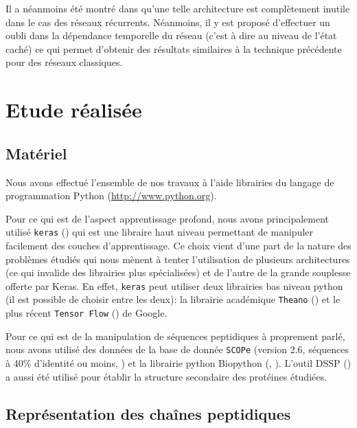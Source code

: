 \documentclass[a4paper, 11pt, onecolumn]{article}
\begin{document}
Il a néanmoins été montré dans \cite{gal2015theoretically} qu'une telle
architecture est complètement inutile dans le cas des réseaux récurrents.
Néanmoins, il y est proposé d'effectuer un oubli dans la dépendance temporelle
du réseau (c'est à dire au niveau de l'état caché) ce qui permet d'obtenir des
résultats similaires à la technique précédente pour des réseaux classiques.

\section{Etude réalisée}
\label{sec:etude}

\subsection{Matériel}

Nous avons effectué l'ensemble de nos travaux à l'aide librairies du langage de
programmation Python (\url{http://www.python.org}).

Pour ce qui est de l'aspect apprentissage profond, nous avons principalement
utilisé \texttt{keras} (\cite{chollet2015keras}) qui est une libraire haut niveau
permettant de manipuler facilement des couches d'apprentissage. Ce choix vient
d'une part de la nature des problèmes étudiés qui nous mènent à tenter
l'utilisation de plusieurs architectures (ce qui invalide des librairies plus spécialisées) et de l'autre de la grande
souplesse offerte par Keras. En effet, \texttt{keras} peut utiliser deux
librairies bas niveau python (il est possible de choisir entre les deux): la
librairie académique \texttt{Theano} (\cite{2016arXiv160502688full}) et le plus récent
\texttt{Tensor Flow} (\cite{tensorflow2015-whitepaper}) de Google.

Pour ce qui est de la manipulation de séquences peptidiques à proprement parlé,
nous avons utilisé des données de la base de donnée \texttt{SCOPe}
(version 2.6, séquences à 40\% d'identité ou moins, \cite{fox2014scope}) et la librairie python Biopython (\cite{Cock01062009},
\cite{hamelryck2003pdb}). L'outil DSSP (\cite{kabsch1983dictionary}) a aussi été
utilisé pour établir la structure secondaire des protéines étudiées.

\subsection{Représentation des chaînes peptidiques}
\end{document}
